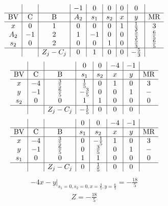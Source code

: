 \documentclass{article}
\begin{document}
\begin{align*}
\begin{array}{c|c|c|c|c|c|c|c|c}
 &  &  & -1 & 0 & 0 & 0 & 0 & \\
\hline
\text{BV} & \text{C} & \text{B} & A_{2} & s_{1} & s_{2} & x & y & \text{MR} \\
\hline
x & 0 & 1 & 0 & 0 & 0 & 1 & \frac{1}{3} & 3 \\
A_{2} & -1 & 2 & 1 & -1 & 0 & 0 & \frac{5}{3} & \frac{6}{5} \\
s_{2} & 0 & 2 & 0 & 0 & 1 & 0 & \frac{5}{3} & \frac{6}{5} \\
\hline
 &  & Z_j-C_j & 0 & 1 & 0 & 0 & -\frac{5}{3} & \\
\end{array}
\end{align*}
\begin{align*}
\begin{array}{c|c|c|c|c|c|c|c}
 &  &  & 0 & 0 & -4 & -1 & \\
\hline
\text{BV} & \text{C} & \text{B} & s_{1} & s_{2} & x & y & \text{MR} \\
\hline
x & -4 & \frac{3}{5} & \frac{1}{5} & 0 & 1 & 0 & 3 \\
y & -1 & \frac{6}{5} & -\frac{3}{5} & 0 & 0 & 1 & - \\
s_{2} & 0 & 0 & 1 & 1 & 0 & 0 & 0 \\
\hline
 &  & Z_j-C_j & -\frac{1}{5} & 0 & 0 & 0 & \\
\end{array}
\end{align*}
\begin{align*}
\begin{array}{c|c|c|c|c|c|c|c}
 &  &  & 0 & 0 & -4 & -1 & \\
\hline
\text{BV} & \text{C} & \text{B} & s_{1} & s_{2} & x & y & \text{MR} \\
\hline
x & -4 & \frac{3}{5} & 0 & -\frac{1}{5} & 1 & 0 & 3 \\
y & -1 & \frac{6}{5} & 0 & \frac{3}{5} & 0 & 1 & - \\
s_{1} & 0 & 0 & 1 & 1 & 0 & 0 & 0 \\
\hline
 &  & Z_j-C_j & 0 & \frac{1}{5} & 0 & 0 & \\
\end{array}
\end{align*}
\begin{align*}
\left.-4x - y\right|_{s_{1}=0,s_{2}=0,x=\frac{3}{5},y=\frac{6}{5}}=-\frac{18}{5}\end{align*}
\begin{align*}
Z=-\frac{18}{5}\end{align*}
\end{document}
